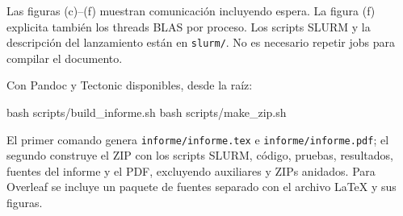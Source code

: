 \documentclass[
  spanish,
  11pt,
  a4paper,
]{article}
\newenvironment{Shaded}{}{}
\newcommand{\FunctionTok}[1]{\textcolor[rgb]{0.02,0.16,0.49}{#1}}
\newcommand{\NormalTok}[1]{#1}
\begin{document}
Las figuras (c)--(f) muestran comunicación incluyendo espera. La figura
(f) explicita también los threads BLAS por proceso. Los scripts SLURM y
la descripción del lanzamiento están en \texttt{slurm/}. No es necesario
repetir jobs para compilar el documento.

Con Pandoc y Tectonic disponibles, desde la raíz:

\begin{samepage}

\begin{Shaded}
\begin{Highlighting}[]
\FunctionTok{bash}\NormalTok{ scripts/build\_informe.sh}
\FunctionTok{bash}\NormalTok{ scripts/make\_zip.sh}
\end{Highlighting}
\end{Shaded}

\end{samepage}

El primer comando genera \texttt{informe/informe.tex} e
\texttt{informe/informe.pdf}; el segundo construye el ZIP con los
scripts SLURM, código, pruebas, resultados, fuentes del informe y el
PDF, excluyendo auxiliares y ZIPs anidados. Para Overleaf se incluye un
paquete de fuentes separado con el archivo LaTeX y sus figuras.
\end{document}
